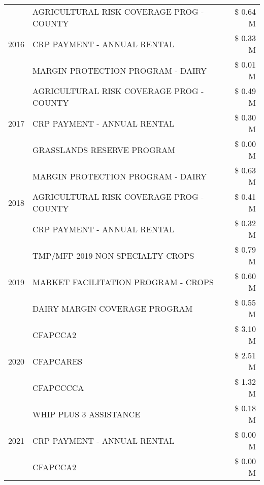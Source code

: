 \begin{tabular}{llr}
\cline{1-3}
\multirow[t]{3}{*}{2016} & AGRICULTURAL RISK COVERAGE PROG - COUNTY & \$ 0.64 M \\
 & CRP PAYMENT - ANNUAL RENTAL & \$ 0.33 M \\
 & MARGIN PROTECTION PROGRAM - DAIRY & \$ 0.01 M \\
\cline{1-3}
\multirow[t]{3}{*}{2017} & AGRICULTURAL RISK COVERAGE PROG - COUNTY & \$ 0.49 M \\
 & CRP PAYMENT - ANNUAL RENTAL & \$ 0.30 M \\
 & GRASSLANDS RESERVE PROGRAM & \$ 0.00 M \\
\cline{1-3}
\multirow[t]{3}{*}{2018} & MARGIN PROTECTION PROGRAM - DAIRY & \$ 0.63 M \\
 & AGRICULTURAL RISK COVERAGE PROG - COUNTY & \$ 0.41 M \\
 & CRP PAYMENT - ANNUAL RENTAL & \$ 0.32 M \\
\cline{1-3}
\multirow[t]{3}{*}{2019} & TMP/MFP 2019 NON SPECIALTY CROPS & \$ 0.79 M \\
 & MARKET FACILITATION PROGRAM - CROPS & \$ 0.60 M \\
 & DAIRY MARGIN COVERAGE PROGRAM & \$ 0.55 M \\
\cline{1-3}
\multirow[t]{3}{*}{2020} & CFAPCCA2 & \$ 3.10 M \\
 & CFAPCARES & \$ 2.51 M \\
 & CFAPCCCCA & \$ 1.32 M \\
\cline{1-3}
\multirow[t]{3}{*}{2021} & WHIP PLUS 3 ASSISTANCE & \$ 0.18 M \\
 & CRP PAYMENT - ANNUAL RENTAL & \$ 0.00 M \\
 & CFAPCCA2 & \$ 0.00 M \\
\cline{1-3}
\bottomrule
\end{tabular}
